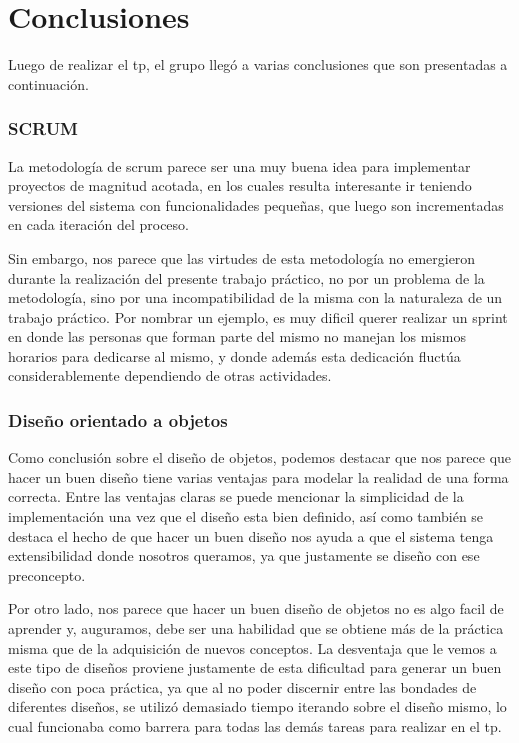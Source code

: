 \section{Conclusiones}

Luego de realizar el tp, el grupo lleg\'o a varias conclusiones que son presentadas a continuaci\'on.


\subsubsection{SCRUM}
La metodolog\'ia de scrum parece ser una muy buena idea para implementar proyectos de magnitud acotada, en los cuales resulta interesante ir teniendo versiones del sistema con funcionalidades pequeñas, que luego son incrementadas en cada iteraci\'on del proceso.

Sin embargo, nos parece que las virtudes de esta metodolog\'ia no emergieron durante la realizaci\'on del presente trabajo pr\'actico, no por un problema de la metodolog\'ia, sino por una incompatibilidad de la misma con la naturaleza de un trabajo pr\'actico. Por nombrar un ejemplo, es muy dificil querer realizar un sprint en donde las personas que forman parte del mismo no manejan los mismos horarios para dedicarse al mismo, y donde adem\'as esta dedicaci\'on fluct\'ua considerablemente dependiendo de otras actividades.

\subsubsection{Diseño orientado a objetos}

Como conclusi\'on sobre el diseño de objetos, podemos destacar que nos parece que hacer un buen diseño tiene varias ventajas para modelar la realidad de una forma correcta. Entre las ventajas claras se puede mencionar la simplicidad de la implementaci\'on una vez que el diseño esta bien definido, as\'i como tambi\'en se destaca el hecho de que hacer un buen diseño nos ayuda a que el sistema tenga extensibilidad donde nosotros queramos, ya que justamente se diseño con ese preconcepto.

Por otro lado, nos parece que hacer un buen diseño de objetos no es algo facil de aprender y, auguramos, debe ser una habilidad que se obtiene m\'as de la pr\'actica misma que de la adquisici\'on de nuevos conceptos. La desventaja que le vemos a este tipo de diseños proviene justamente de esta dificultad para generar un buen diseño con poca pr\'actica, ya que al no poder discernir entre las bondades de diferentes diseños, se utiliz\'o demasiado tiempo iterando sobre el diseño mismo, lo cual funcionaba como barrera para todas las dem\'as tareas para realizar en el tp.


